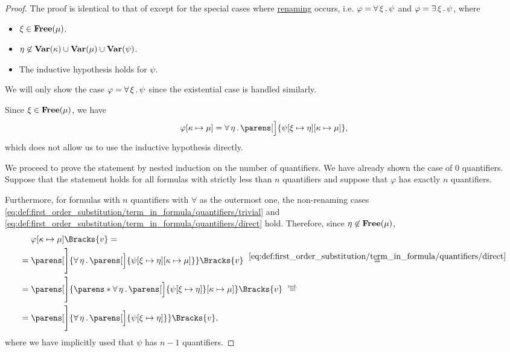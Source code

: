 \begin{proof}
   The proof is identical to that of  except for the special cases where \hyperref[rem:first_order_substitution_renaming_justification]{renaming} occurs, i.e. \( \varphi = \forall \thinspace \xi \thinspace . \thinspace \psi \) and \( \varphi = \exists \thinspace \xi \thinspace . \thinspace \psi \), where
  \begin{itemize}
    \item \( \xi \in \operatorname{\mathbf{Free}}(\mu) \).
    \item \( \eta \not\in \operatorname{\mathbf{Var}}(\kappa) \cup \operatorname{\mathbf{Var}}(\mu) \cup \operatorname{\mathbf{Var}}(\psi) \).
    \item The inductive hypothesis holds for \( \psi \).
  \end{itemize}

  We will only show the case \( \varphi = \forall \thinspace \xi \thinspace . \thinspace \psi \) since the existential case is handled similarly.

  Since \( \xi \in \operatorname{\mathbf{Free}}(\mu) \), we have
  \begin{equation*}
    \varphi[\kappa \mapsto \mu]
    =
    \qforall \eta \parens[\Big]{ \psi[\xi \mapsto \eta][\kappa \mapsto \mu] },
  \end{equation*}
  which does not allow us to use the inductive hypothesis directly.

  We proceed to prove the statement by nested induction on the number of quantifiers. We have already shown the case of \( 0 \) quantifiers. Suppose that the statement holds for all formulas with strictly less than \( n \) quantifiers and suppose that \( \varphi \) has exactly \( n \) quantifiers.

  Furthermore, for formulas with \( n \) quantifiers with \( \forall \) as the outermost one, the non-renaming cases \eqref{eq:def:first_order_substitution/term_in_formula/quantifiers/trivial} and \eqref{eq:def:first_order_substitution/term_in_formula/quantifiers/direct} hold. Therefore, since \( \eta \not\in \operatorname{\mathbf{Free}}(\mu) \),
  \begin{equation}\label{eq:thm:first_order_substitution_equivalence/term_in_formula/nested_induction}
    \begin{aligned}
      &\phantom{{}={}}
      \varphi[\kappa \mapsto \mu]\Bracks{v}
      = \\ &=
      \parens[\Bigg]{\qforall \eta \parens[\Big]{ \psi[\xi \mapsto \eta][\kappa \mapsto \mu] }}\Bracks{v}
      \reloset {\eqref{eq:def:first_order_substitution/term_in_formula/quantifiers/direct}} = \\ &=
      \parens[\Bigg]{ \parens*{ \qforall \eta \parens[\Big]{ \psi[\xi \mapsto \eta] } }[\kappa \mapsto \mu] }\Bracks{v}
      \reloset {\T{ind.}} = \\ &=
      \parens[\Bigg]{\qforall \eta \parens[\Big]{ \psi[\xi \mapsto \eta] } }\Bracks{v},
    \end{aligned}
  \end{equation}
  where we have implicitly used that \( \psi \) has \( n - 1 \) quantifiers.


\end{proof}
